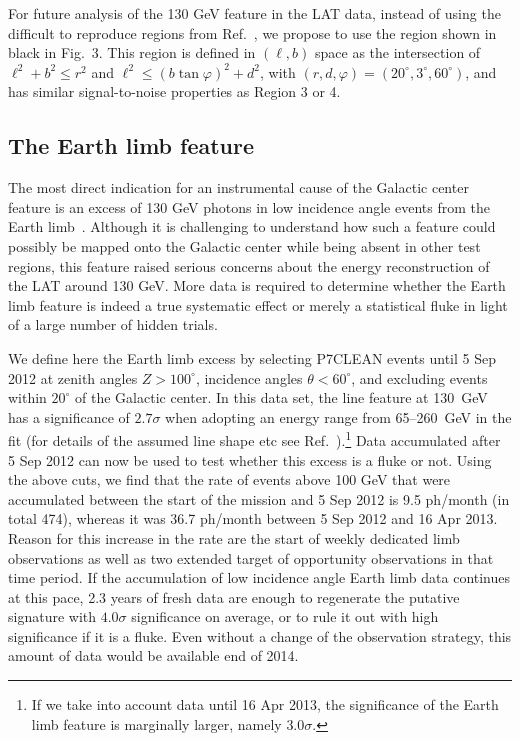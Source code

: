\documentclass[aps,prd,superscriptaddress,showpacs,nofootinbib,fixlfloat, 12pt]{revtex4-1}
\begin{document}
\medskip
For future analysis of the 130 GeV feature in the LAT data, instead of using the difficult to reproduce regions from
Ref.~\cite{Weniger:2012}, we propose to use the region shown in black in
Fig.~3. This region is defined in $(\ell, b)$ space as the intersection of
$\ell^2+b^2\leq r^2$ and $\ell^2\leq (b\tan\varphi)^2 + d^2$, with $(r,
d, \varphi) = (20^\circ, 3^\circ, 60^\circ)$, and has similar signal-to-noise
properties as Region 3 or 4. 

\subsection{The Earth limb feature}
The most direct indication for an instrumental cause of the Galactic center
feature is an excess of 130 GeV photons in low incidence angle events from
the Earth limb~\cite{linepaper, finkbeiner_systematics, Hektor:2012ev,
bloom_charles_fermi_lat_line}. Although it is challenging to understand how
such a feature could possibly be mapped onto the Galactic center while being
absent in other test regions, this feature raised serious concerns about the
energy reconstruction of the LAT around 130 GeV. More data is required to
determine whether the Earth limb feature is indeed a true systematic effect or
merely a statistical fluke in light of a large number of hidden trials.

We define here the Earth limb excess by selecting P7CLEAN events until 5 Sep 2012 at zenith angles $Z>100^\circ$,
incidence angles $\theta<60^\circ$, and excluding events within $20^\circ$ of
the Galactic center. In this data set, the line feature at 130~GeV has a
significance of $2.7\sigma$ when
adopting an energy range from 65--260~GeV in the fit (for details of the assumed line shape etc
see Ref.~\cite{finkbeiner_systematics}).\footnote{If we take into account data
  until 16 Apr 2013, the
significance of the Earth limb feature is marginally larger, namely
$3.0\sigma$.} Data accumulated after 5 Sep 2012 can
now be used to test whether this excess is a fluke or not. Using the above
cuts, we find that the rate of events above 100 GeV that were accumulated between the
start of the mission and 5 Sep 2012 is 9.5 ph/month (in total 474), whereas it
was 36.7 ph/month between 5 Sep 2012 and 16 Apr 2013. Reason for this increase
in the rate are the start of weekly dedicated limb observations as well as two extended
target of opportunity observations in that time period. If the accumulation of
low incidence angle Earth limb data continues at this pace, 2.3 years of fresh
data are enough to regenerate the putative signature with $4.0\sigma$
significance on average, or to rule it out with high significance if it is a
fluke. Even without a change of the observation strategy, this amount of data
would be available end of 2014.
\end{document}

